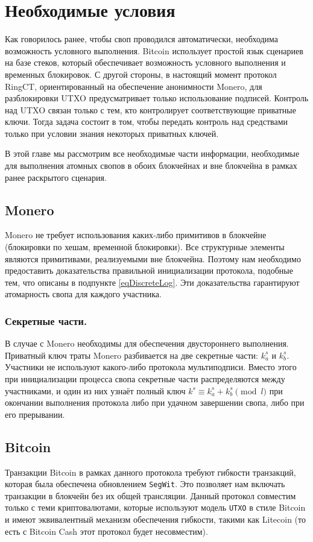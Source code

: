 \documentclass{llncs}
\begin{document}
\section{Необходимые условия}
\label{prerequisites}
Как говорилось ранее, чтобы своп проводился автоматически, необходима возможность условного выполнения. Bitcoin использует простой язык сценариев на базе стеков, который обеспечивает возможность условного выполнения и временных блокировок. С другой стороны, в настоящий момент протокол RingCT, ориентированный на обеспечение анонимности Monero, для разблокировки UTXO предусматривает только использование подписей. Контроль над UTXO связан только с тем, кто контролирует соответствующие приватные ключи. Тогда задача состоит в том, чтобы передать контроль над средствами только при условии знания некоторых приватных ключей.

В этой главе мы рассмотрим все необходимые части информации, необходимые для выполнения атомных свопов в обоих блокчейнах и вне блокчейна в рамках ранее раскрытого сценария.

\subsection{Monero}
Monero не требует использования каких-либо примитивов в блокчейне (блокировки по хешам, временной блокировки). Все структурные элементы являются примитивами, реализуемыми вне блокчейна. Поэтому нам необходимо предоставить доказательства правильной инициализации протокола, подобные тем, что описаны в подпункте \ref{eqDiscreteLog}. Эти доказательства гарантируют атомарность свопа для каждого участника.

\subsubsection{Секретные части.}
В случае с Monero необходимы для обеспечения двустороннего выполнения. Приватный ключ траты Monero разбивается на две секретные части: $k^s_a$ и $k^s_b$. Участники не используют какого-либо протокола мультиподписи. Вместо этого при инициализации процесса свопа секретные части распределяются между участниками, и один из них узнаёт полный ключ $k^s \equiv k^s_a + k^s_b \pmod l$ при окончании выполнения протокола либо при удачном завершении свопа, либо при его прерывании.

\subsection{Bitcoin}
\label{bitcoinPrerequisites}
Транзакции Bitcoin в рамках данного протокола требуют гибкости транзакций, которая была обеспечена обновлением \texttt{SegWit}. Это позволяет нам включать транзакции в блокчейн без их общей трансляции. Данный протокол совместим только с теми криптовалютами, которые используют модель \texttt{UTXO} в стиле Bitcoin и имеют эквивалентный механизм обеспечения гибкости, такими как Litecoin (то есть с Bitcoin Cash этот протокол будет несовместим).
\end{document}
